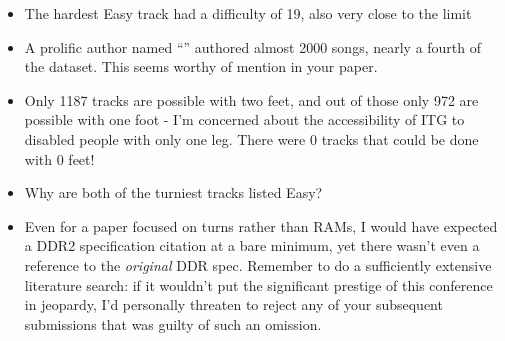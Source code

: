 \documentclass[12pt]{article}
\begin{document}
\begin{itemize}
\item The hardest Easy track had a difficulty of 19, also very close to the limit

\item A prolific author named ``'' authored almost 2000 songs, nearly a fourth of the dataset. This
seems worthy of mention in your paper.

\item Only 1187 tracks are possible with two feet, and out of those only 972 are possible with one
foot - I'm concerned about the accessibility of ITG to disabled people with only one leg.
There were 0 tracks that could be done with 0 feet!

\item Why are both of the turniest tracks listed Easy?

\item Even for a paper focused on turns rather than RAMs, I would have expected a DDR2 specification
citation at a bare minimum, yet there wasn't even a reference to the \textit{original} DDR spec.
Remember to do a sufficiently extensive literature search: if it wouldn't put the significant
prestige of this conference in jeopardy, I'd personally threaten to reject any of your subsequent
submissions that was guilty of such an omission.
\end{itemize}
 
\end{document}
